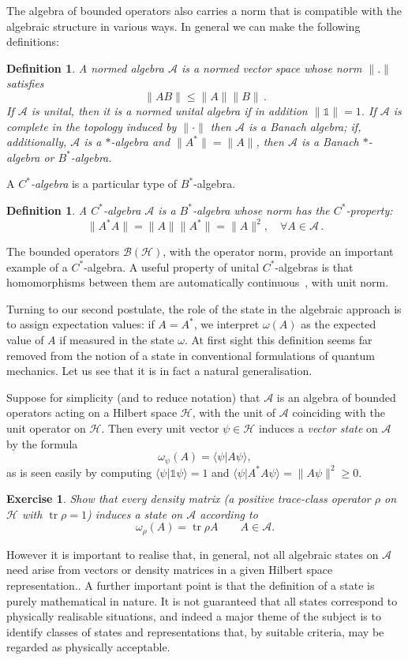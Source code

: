 \documentclass[12pt,a4paper]{article}
\newcommand{\1}{\mathds{1}}                         %
\newcommand{\Hcal}{\mathcal {H}}
\newcommand{\Bcal}{\mathcal {B}}
\newcommand{\HH}{{\mathcal{H}}}
\newcommand{\II}{{\mathbb{1}}}
\newcommand{\Ac}{{\mathcal{A}}}
\newcommand{\ip}[2]{\langle #1|#2\rangle}
\newtheorem{exercise}[theorem]{Exercise}
\newtheorem{df}[theorem]{Definition}}
\DeclareMathOperator{\tr}{tr}
\begin{document}
The algebra of bounded operators also carries a norm that is compatible with the algebraic structure in various ways. In general we can make the following definitions: 
\begin{df}
	A \emph{normed algebra} $\Ac$ is a normed vector space whose norm $\|.\|$ satisfies
	\[
	\|AB\|\leq\|A\|\|B\|\,.
	\] 
	If $\Ac$ is unital, then it is a \emph{normed unital algebra} if in addition $\|\1\|=1$. If $\Ac$ is complete in the topology induced by $\|\cdot\|$ then 
	$\Ac$ is a \emph{Banach algebra}; if, additionally, $\Ac$ is a $*$-algebra and $\|A^*\|=\|A\|$, then $\Ac$ is a \emph{Banach $*$-algebra} or $B^*$-algebra. 
\end{df} 
A \emph{$C^*$-algebra} is a particular type of $B^*$-algebra.  
\begin{df}
A \emph{$C^*$-algebra} $\Ac$ is a $B^*$-algebra whose norm has the $C^*$-property:
	\[
	\|A^* A \| = \|A\|\|A^*\| = \|A\|^2, \quad\forall A\in \Ac\,.
	\]
\end{df}
The bounded operators $\Bcal(\Hcal)$, with the operator norm, provide an important example of a $C^*$-algebra. A useful property of unital $C^*$-algebras is that homomorphisms between them are automatically continuous~\cite[Prop.~2.3.1]{BratRob:vol1}, with unit norm. 

Turning to our second postulate,  
the role of the state in the algebraic approach is to assign expectation values:
if $A=A^*$, we interpret $\omega(A)$ as the expected value of $A$ if measured in the state $\omega$. At first sight this definition seems far removed from the notion of a state in conventional formulations of quantum mechanics. Let us see that it is in fact a natural generalisation.

Suppose for simplicity (and to reduce notation) that $\Ac$ is an algebra of bounded operators acting on a Hilbert space $\HH$, with the unit of $\Ac$ coinciding with the unit operator on $\HH$. Then every unit vector $\psi\in\HH$ induces a \emph{vector state} on $\Ac$ by the formula
\[
\omega_\psi(A) = \ip{\psi}{A\psi},
\] 
as is seen easily by computing $\ip{\psi}{\II\psi}=1$ and $\ip{\psi}{A^*A\psi}=\|A\psi\|^2\ge 0$. 
\begin{exercise}
	Show that every density matrix (a positive trace-class operator $\rho$ on $\HH$ with $\tr\rho=1$) induces a state on $\Ac$ according to 
	\[
	\omega_\rho(A) = \tr\rho A\qquad A\in\Ac.
	\]
\end{exercise}
However it is important to realise that, in general, not all algebraic states on $\Ac$ need arise from vectors or density matrices in a given Hilbert space representation.. 
A further important point is that the definition of a state is purely mathematical in nature. It is not guaranteed that all states correspond to physically realisable situations, and indeed a major theme of the subject is to identify classes of states and representations that, by suitable criteria, may be regarded as physically acceptable. 
\end{document}
